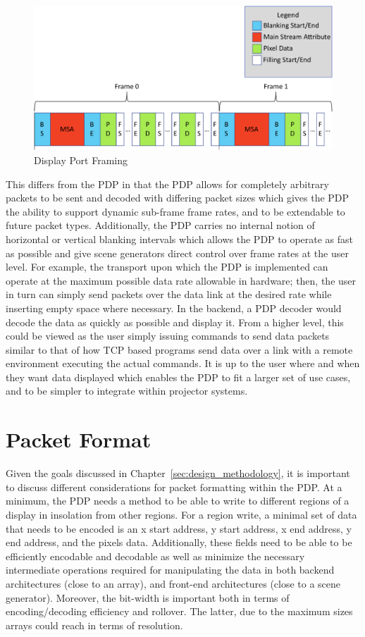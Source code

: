     \begin{figure}
        \centering
        \includegraphics[width=1.0\textwidth]{fig/display_port_framing.pdf}
        \caption{Display Port Framing}
        \label{fig:display_port_framing}
    \end{figure}

    This differs from the PDP in that the PDP allows for completely arbitrary packets to be sent and decoded with differing packet sizes which gives the PDP the ability to support dynamic sub-frame frame rates, and to be extendable to future packet types. Additionally, the PDP carries no internal notion of horizontal or vertical blanking intervals which allows the PDP to operate as fast as possible and give scene generators direct control over frame rates at the user level. For example, the transport upon which the PDP is implemented can operate at the maximum possible data rate allowable in hardware; then, the user in turn can simply send packets over the data link at the desired rate while inserting empty space where necessary. In the backend, a PDP decoder would decode the data as quickly as possible and display it. From a higher level, this could be viewed as the user simply issuing commands to send data packets similar to that of how TCP based programs send data over a link with a remote environment executing the actual commands. It is up to the user where and when they want data displayed which enables the PDP to fit a larger set of use cases, and to be simpler to integrate within projector systems.

\section{Packet Format}
    \label{sec:packet_format}
    Given the goals discussed in Chapter~\ref{sec:design_methodology}, it is important to discuss different considerations for packet formatting within the PDP. At a minimum, the PDP needs a method to be able to write to different regions of a display in insolation from other regions. For a region write, a minimal set of data that needs to be encoded is an x start address, y start address, x end address, y end address, and the pixels data. Additionally, these fields need to be able to be efficiently encodable and decodable as well as minimize the necessary intermediate operations required for manipulating the data in both backend architectures (close to an array), and front-end architectures (close to a scene generator). Moreover, the bit-width is important both in terms of encoding/decoding efficiency and rollover. The latter, due to the maximum sizes arrays could reach in terms of resolution.

